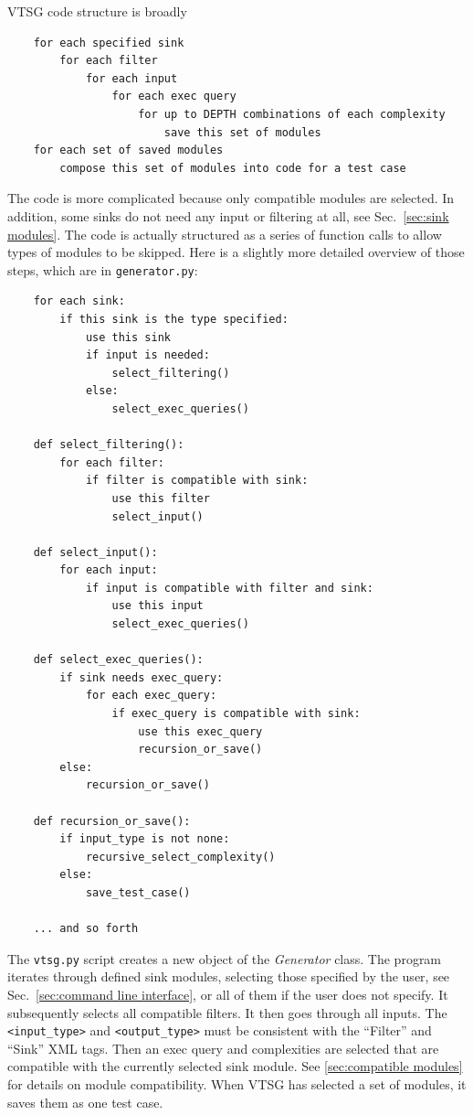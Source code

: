 VTSG code structure is broadly
\begin{verbatim}
    for each specified sink
        for each filter
            for each input
                for each exec query
                    for up to DEPTH combinations of each complexity
                        save this set of modules
    for each set of saved modules
        compose this set of modules into code for a test case
\end{verbatim}
The code is more complicated because only compatible modules are 
selected.
In addition, some sinks do not need any input or filtering at all,
see Sec.~\ref{sec:sink modules}.
The code is actually structured as a series of function calls to allow types
of modules to be skipped.  Here is a slightly more detailed
overview of those steps, which are in \verb|generator.py|:
\begin{verbatim}
    for each sink:
        if this sink is the type specified:
            use this sink
            if input is needed:
                select_filtering()
            else:
                select_exec_queries()
    
    def select_filtering():
        for each filter:
            if filter is compatible with sink:
                use this filter
                select_input()
    
    def select_input():
        for each input:
            if input is compatible with filter and sink:
                use this input
                select_exec_queries()

    def select_exec_queries():
        if sink needs exec_query:
            for each exec_query:
                if exec_query is compatible with sink:
                    use this exec_query
                    recursion_or_save()
        else:
            recursion_or_save()

    def recursion_or_save():
        if input_type is not none:
            recursive_select_complexity()
        else:
            save_test_case()

    ... and so forth
\end{verbatim}

The \verb|vtsg.py| script creates a new object of the
\emph{Generator} class. 
The program iterates through defined sink modules, selecting those
specified by the user, see
Sec.~\ref{sec:command line interface}, 
or all of them if the user does not specify. It subsequently
selects all compatible filters.  It then goes through all inputs.
The \verb|<input_type>| and \verb|<output_type>|
must be consistent with the ``Filter'' and ``Sink'' XML tags.
Then an exec query and complexities are selected
that are compatible with the currently selected sink module.
See \ref{sec:compatible modules} for details on module compatibility.
When VTSG has selected a set of modules, it saves them as one test case.

